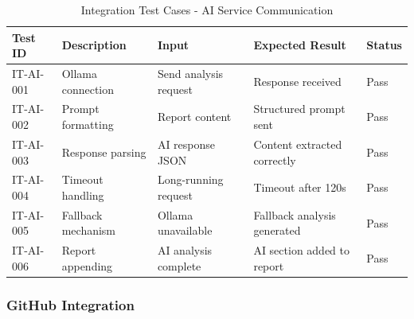 \documentclass[12pt,a4paper]{article}
\begin{document}
    \begin{table}[H]
        \caption{Integration Test Cases - AI Service Communication}
        \begin{tabular}{|p{2cm}|p{4cm}|p{3cm}|p{3cm}|p{1.5cm}|}
            \hline
            \textbf{Test ID} & \textbf{Description} & \textbf{Input} & \textbf{Expected Result} & \textbf{Status} \\
            \hline
            IT-AI-001 & Ollama connection & Send analysis request & Response received & Pass \\
            \hline
            IT-AI-002 & Prompt formatting & Report content & Structured prompt sent & Pass \\
            \hline
            IT-AI-003 & Response parsing & AI response JSON & Content extracted correctly & Pass \\
            \hline
            IT-AI-004 & Timeout handling & Long-running request & Timeout after 120s & Pass \\
            \hline
            IT-AI-005 & Fallback mechanism & Ollama unavailable & Fallback analysis generated & Pass \\
            \hline
            IT-AI-006 & Report appending & AI analysis complete & AI section added to report & Pass \\
            \hline
        \end{tabular}
    \end{table}

    \subsubsection{GitHub Integration}
\end{document}
